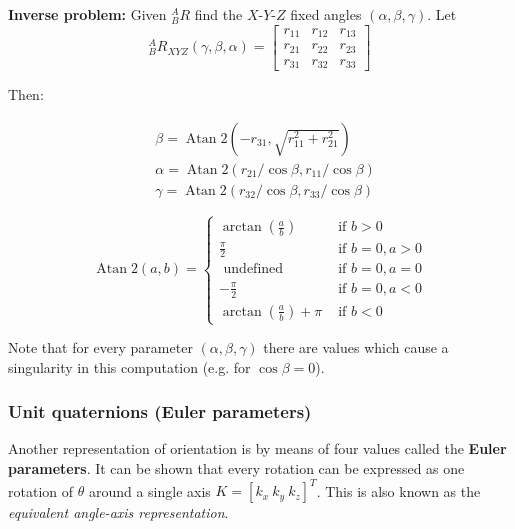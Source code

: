 \textbf{Inverse problem:} Given $^{A}_{B}R$ find the $X$-$Y$-$Z$ fixed angles $(\alpha, \beta, \gamma)$. Let
\[{ }_{B}^A R_{X Y Z}(\gamma, \beta, \alpha)=\left[\begin{array}{lll}
r_{11} & r_{12} & r_{13} \\
r_{21} & r_{22} & r_{23} \\
r_{31} & r_{32} & r_{33}
\end{array}\right] \]

\begin{minipage}{0.4\textwidth}
Then:

\begin{align*}
&\beta=\operatorname{Atan} 2\left(-r_{31}, \sqrt{\left.r_{11}^{2}+r_{21}^{2}\right.}\right) \\
&\alpha=\operatorname{Atan} 2\left(r_{21} / \cos \beta, r_{11} / \cos \beta\right) \\
&\gamma=\operatorname{Atan} 2\left(r_{32} / \cos \beta, r_{33} / \cos \beta\right)
\end{align*}
	
\end{minipage}
\begin{minipage}{0.49\textwidth}
	\[ \operatorname{Atan} 2(a, b)= \begin{cases}\arctan \left(\frac{a}{b}\right) & \text { if } b>0 \\ \frac{\pi}{2} & \text { if } b=0, a>0 \\ \text { undefined } & \text { if } b=0, a=0 \\ -\frac{\pi}{2} & \text { if } b=0, a<0 \\ \arctan \left(\frac{a}{b}\right)+\pi & \text { if } b<0\end{cases} \]
\end{minipage}
\vspace{0.5cm}

 Note that for every parameter $(\alpha, \beta, \gamma)$ there are values which cause a singularity in this computation (e.g. for $\cos \beta = 0$).

\subsubsection{Unit quaternions (Euler parameters)}
Another representation of orientation is by means of four values called the \textbf{Euler parameters}. It can be shown that every rotation can be expressed as one rotation of $\theta$ around a single axis $K = [k_x\ k_y\ k_z]^T$. This is also known as the \textit{equivalent angle-axis representation}. 


